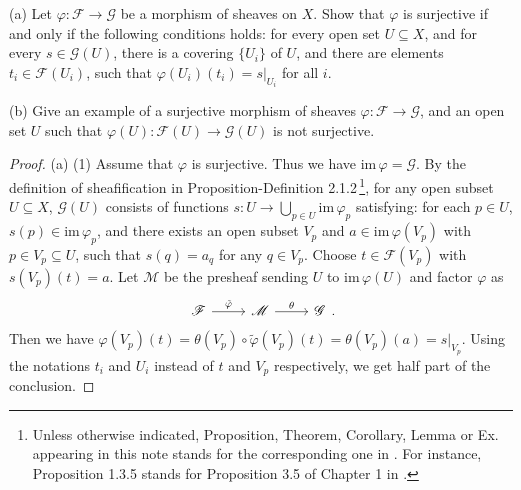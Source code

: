 \begin{exe}
	\label{2.1.3}
	(a) Let $\varphi :\mathscr{F} \rightarrow\mathscr{G} $ be a morphism of sheaves on $X$. Show that
	$\varphi$ is surjective if and only if the following conditions holds: for every open set $U\subseteq X$, and for
	every $s\in\mathscr{G}(U)$, there is a covering $\{U_i\}$ of $U$, and there are elements $t_i\in\mathscr{F}(U_i)$,
	such that $\varphi(U_i)(t_i)=s|_{U_i}$ for all $i$.
	
	(b) Give an example of a surjective morphism of sheaves $\varphi :\mathscr{F} \rightarrow  \mathscr{G} $,
	and an open set $U$ such that $\varphi(U):\mathscr{F}(U) \rightarrow  \mathscr{G}(U) $ is not surjective.
\end{exe}

\begin{proof}
	(a) (1) Assume that $\varphi$ is surjective. Thus we have $\mathrm{im}\,\varphi=\mathscr{G}$. By the definition of sheafification in Proposition-Definition 2.1.2\,\footnote{Unless otherwise indicated, Proposition, Theorem, Corollary, Lemma or Ex. appearing in this note stands for the corresponding one in \cite{HAR}. For instance, Proposition 1.3.5 stands for Proposition 3.5 of Chapter 1 in \cite{HAR}.}, for any open subset $U\subseteq X$, $\mathscr{G}(U)$ consists of functions $s:U\to\bigcup_{p\in U}\mathrm{im}\,\varphi_p$ satisfying: for each $p\in U$, $s(p)\in\mathrm{im}\,\varphi_p$, and there exists an open subset $V_p$ and $a\in \mathrm{im}\,\varphi(V_p)$ with $p\in V_p \subseteq U$, such that
	$s(q)=a_q$ for any $q\in V_p$. Choose $t\in\mathscr{F}(V_p)$ with $s(V_p)(t)=a$. Let $\mathscr{M}$ be the presheaf sending $U$ to $\mathrm{im}\,\varphi(U)$ and factor $\varphi$ as
	\begin{equation*}
		\begin{tikzcd}
			\mathscr{F} \arrow[r, "\tilde{\varphi}"] & \mathscr{M} \arrow[r, "\theta"] & \mathscr{G}
		\end{tikzcd}.
	\end{equation*}
	Then we have $\varphi(V_p)(t)=\theta(V_p)\circ\tilde{\varphi}(V_p)(t)=\theta(V_p)(a)=s|_{V_p}$. Using the notations $t_i$ and $U_i$ instead of $t$ and $V_p$ respectively, we get half part of the conclusion.
	

\end{proof}
